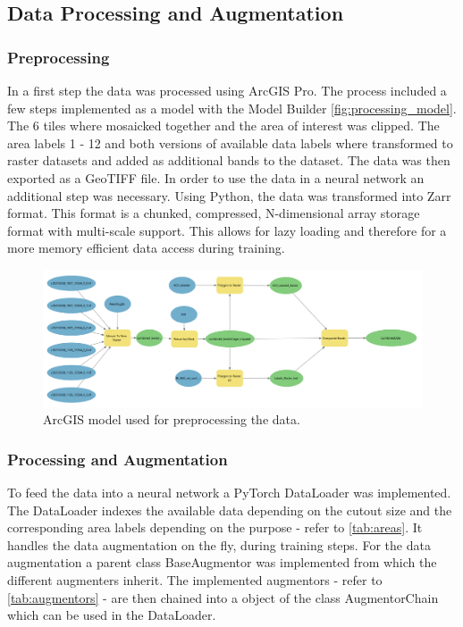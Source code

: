 \subsection{Data Processing and Augmentation}%

\subsubsection{Preprocessing}%
In a first step the data was processed using ArcGIS Pro. The process included a few steps implemented as
a model with the Model Builder \autoref{fig:processing_model}. The 6 tiles where mosaicked together and the area of interest 
was clipped. The area labels 1 - 12 and both versions of available data labels where transformed to raster datasets
and added as additional bands to the dataset. The data was then exported as a GeoTIFF file.
In order to use the data in a neural network an additional step was necessary. Using Python,
the data was transformed into Zarr format. This format is a chunked, compressed, N-dimensional array
storage format with multi-scale support. This allows for lazy loading and therefore for a more memory
efficient data access during training.

\begin{figure}[H]
    \centering
    \captionsetup{width=0.8\linewidth}
    \includegraphics[width=\linewidth]{figures/ArcGIS_Model.png}
    \caption{ArcGIS model used for preprocessing the data.}
    \label{fig:processing_model}
\end{figure}


\subsubsection{Processing and Augmentation}%

To feed the data into a neural network a PyTorch DataLoader was implemented.
The DataLoader indexes the available data depending on the cutout size and the 
corresponding area labels depending on the purpose - refer to \autoref{tab:areas}. 
It handles the data augmentation on the fly, during training steps.
For the data augmentation a parent class BaseAugmentor was implemented from which the different augmenters inherit. 
The implemented augmentors - refer to \autoref{tab:augmentors} - are then chained into a object of the class AugmentorChain
which can be used in the DataLoader.

